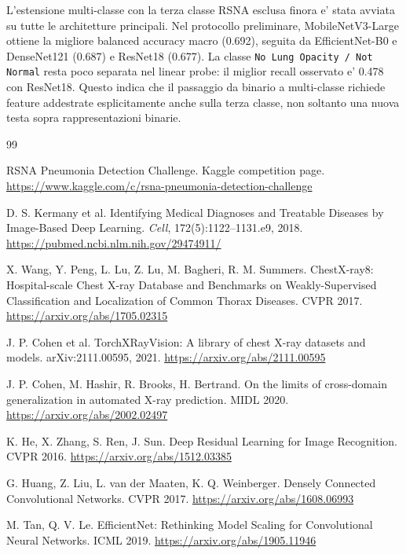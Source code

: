 \documentclass[11pt,a4paper]{article}
\newcommand{\balacc}{balanced accuracy}
\begin{document}
L'estensione multi-classe con la terza classe RSNA esclusa finora e' stata
avviata su tutte le architetture principali. Nel protocollo preliminare,
MobileNetV3-Large ottiene la migliore \balacc{} macro (0.692), seguita da
EfficientNet-B0 e DenseNet121 (0.687) e ResNet18 (0.677). La classe
\texttt{No Lung Opacity / Not Normal} resta poco separata nel linear probe: il
miglior recall osservato e' 0.478 con ResNet18. Questo indica che il passaggio
da binario a multi-classe richiede feature addestrate esplicitamente anche sulla
terza classe, non soltanto una nuova testa sopra rappresentazioni binarie.

\begin{thebibliography}{99}

RSNA Pneumonia Detection Challenge.
\newblock Kaggle competition page.
\newblock \url{https://www.kaggle.com/c/rsna-pneumonia-detection-challenge}

D. S. Kermany et al.
\newblock Identifying Medical Diagnoses and Treatable Diseases by Image-Based Deep Learning.
\newblock \textit{Cell}, 172(5):1122--1131.e9, 2018.
\newblock \url{https://pubmed.ncbi.nlm.nih.gov/29474911/}

X. Wang, Y. Peng, L. Lu, Z. Lu, M. Bagheri, R. M. Summers.
\newblock ChestX-ray8: Hospital-scale Chest X-ray Database and Benchmarks on Weakly-Supervised Classification and Localization of Common Thorax Diseases.
\newblock CVPR 2017.
\newblock \url{https://arxiv.org/abs/1705.02315}

J. P. Cohen et al.
\newblock TorchXRayVision: A library of chest X-ray datasets and models.
\newblock arXiv:2111.00595, 2021.
\newblock \url{https://arxiv.org/abs/2111.00595}

J. P. Cohen, M. Hashir, R. Brooks, H. Bertrand.
\newblock On the limits of cross-domain generalization in automated X-ray prediction.
\newblock MIDL 2020.
\newblock \url{https://arxiv.org/abs/2002.02497}

K. He, X. Zhang, S. Ren, J. Sun.
\newblock Deep Residual Learning for Image Recognition.
\newblock CVPR 2016.
\newblock \url{https://arxiv.org/abs/1512.03385}

G. Huang, Z. Liu, L. van der Maaten, K. Q. Weinberger.
\newblock Densely Connected Convolutional Networks.
\newblock CVPR 2017.
\newblock \url{https://arxiv.org/abs/1608.06993}

M. Tan, Q. V. Le.
\newblock EfficientNet: Rethinking Model Scaling for Convolutional Neural Networks.
\newblock ICML 2019.
\newblock \url{https://arxiv.org/abs/1905.11946}


\end{thebibliography}
\end{document}
